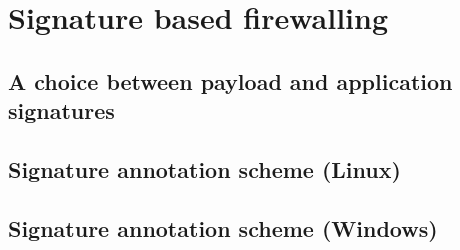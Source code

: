 \chapter{Signature based firewalling}
\label{sign:chapter}

\section{A choice between payload and application signatures}
\label{sign:choice}

\section{Signature annotation scheme (Linux)}
\label{sign:linux}

\section{Signature annotation scheme (Windows)}
\label{sign:windows}



